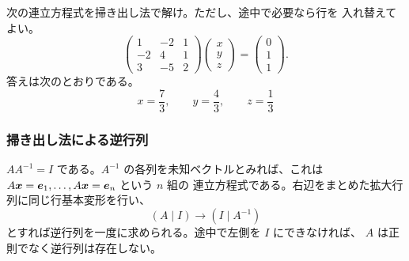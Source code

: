 \begin{example}[演習]
次の連立方程式を掃き出し法で解け。ただし、途中で必要なら行を
入れ替えてよい。
\[
 \begin{pmatrix}1&-2&1\\-2&4&1\\3&-5&2\end{pmatrix}
 \begin{pmatrix}x\\y\\z\end{pmatrix}
 =\begin{pmatrix}0\\1\\1\end{pmatrix}.
\]
答えは次のとおりである。
\[
 \boxed{x=\frac73,\qquad y=\frac43,\qquad z=\frac13}
\]
\end{example}

\subsubsection{掃き出し法による逆行列}

$AA^{-1}=I$ である。$A^{-1}$ の各列を未知ベクトルとみれば、これは
$A\bm{x}=\bm{e}_{1},\ldots,A\bm{x}=\bm{e}_{n}$ という $n$ 組の
連立方程式である。右辺をまとめた拡大行列に同じ行基本変形を行い、
\begin{equation}
 \left(A\mid I\right)\longrightarrow\left(I\mid A^{-1}\right)
\end{equation}
とすれば逆行列を一度に求められる。途中で左側を $I$ にできなければ、
$A$ は正則でなく逆行列は存在しない。


